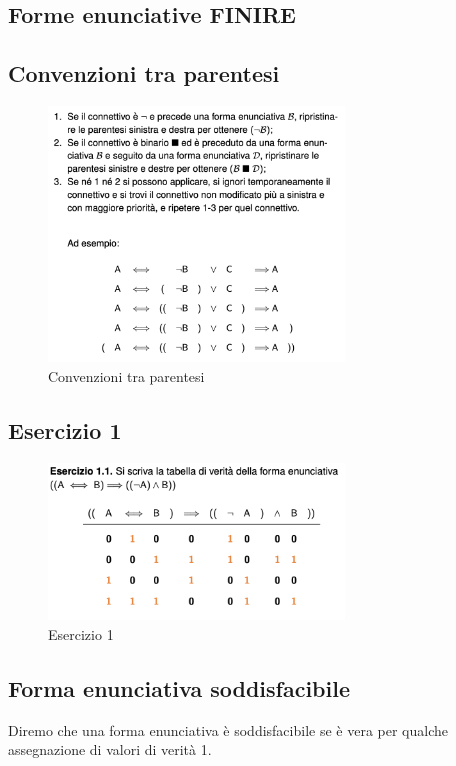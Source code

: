 \documentclass{article}
\begin{document}
\subsection{Forme enunciative FINIRE}



\subsection{Convenzioni tra parentesi}
\begin{figure}
    \centering
    \includegraphics[width=0.7\textwidth]{Screenshot 2024-02-21 at 11.37.14.png}
    \caption{Convenzioni tra parentesi}
    \label{fig:parenthesis}
\end{figure}

\subsection{Esercizio 1}
\begin{figure}
    \centering
    \includegraphics[width=0.7\textwidth]{Screenshot 2024-02-21 at 11.41.48.png}
    \caption{Esercizio 1}
    \label{fig:ex1}
\end{figure}
\subsection{Forma enunciativa soddisfacibile}
Diremo che una forma enunciativa è soddisfacibile se è vera per qualche assegnazione di valori di verità 1.
\end{document}
